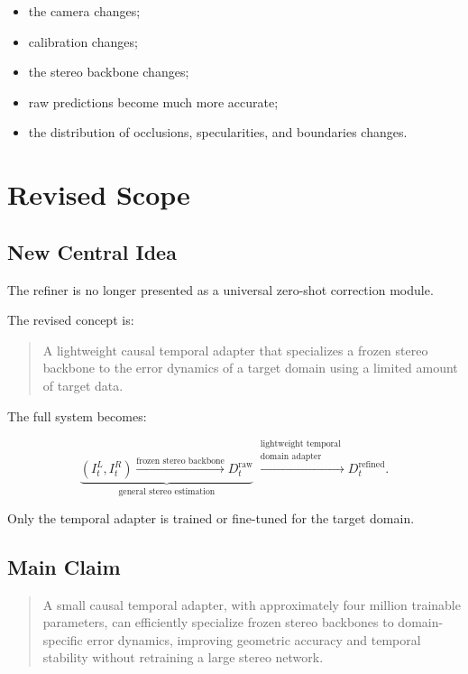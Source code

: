 \documentclass[11pt,a4paper]{article}
\begin{document}
\begin{itemize}[leftmargin=*]
    \item the camera changes;
    \item calibration changes;
    \item the stereo backbone changes;
    \item raw predictions become much more accurate;
    \item the distribution of occlusions, specularities, and boundaries changes.
\end{itemize}

\section{Revised Scope}

\subsection{New Central Idea}

The refiner is no longer presented as a universal zero-shot correction module.

The revised concept is:

\begin{quote}
A lightweight causal temporal adapter that specializes a frozen stereo backbone
to the error dynamics of a target domain using a limited amount of target data.
\end{quote}

The full system becomes:

\begin{equation}
    \underbrace{
    (I_t^L, I_t^R)
    \xrightarrow{\text{frozen stereo backbone}}
    D_t^{\mathrm{raw}}
    }_{\text{general stereo estimation}}
    \xrightarrow{
    \substack{
    \text{lightweight temporal}\\
    \text{domain adapter}
    }}
    D_t^{\mathrm{refined}}.
\end{equation}

Only the temporal adapter is trained or fine-tuned for the target domain.

\subsection{Main Claim}

\begin{quote}
A small causal temporal adapter, with approximately four million trainable
parameters, can efficiently specialize frozen stereo backbones to domain-specific
error dynamics, improving geometric accuracy and temporal stability without
retraining a large stereo network.
\end{quote}
\end{document}
